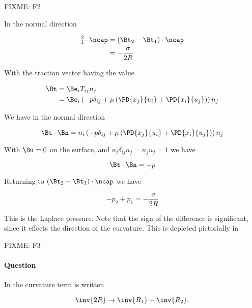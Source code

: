 FIXME: F2

In the normal direction

\begin{align*}
[\Bt]_1^2 \cdot \ncap
&= (\Bt_2 - \Bt_1) \cdot \ncap \\
&= -\frac{\sigma}{2 R} 
\end{align*}

With the traction vector having the value

\begin{align*}
\Bt 
&= \Be_i T_{ij} n_j \\
&= 
\Be_i \left( 
-p \delta_{ij} + \mu \left( 
\PD{x_j}{u_i}
+\PD{x_i}{u_j}
\right)
\right)
n_j
\end{align*}

We have in the normal direction

\begin{equation}\label{eqn:inclinedFlowWithoutConstantHeightAssumption:10}
\Bt \cdot \Bn 
=
n_i \left( 
-p \delta_{ij} + \mu \left( 
\PD{x_j}{u_i}
+\PD{x_i}{u_j}
\right)
\right) n_j
\end{equation}

With $\Bu = 0$ on the surface, and $n_i \delta_{ij} n_j = n_j n_j = 1$ we have

\begin{equation}\label{eqn:inclinedFlowWithoutConstantHeightAssumption:30}
\Bt \cdot \Bn = -p
\end{equation}

Returning to $(\Bt_2 - \Bt_1) \cdot \ncap$ we have

\begin{equation}\label{eqn:inclinedFlowWithoutConstantHeightAssumption:50}
\boxed{
-p_2 + p_1 = -\frac{\sigma}{2 R} 
}
\end{equation}

This is the Laplace pressure.  Note that the sign of the difference is significant, since it effects the direction of the curvature.  This is depicted pictorially in 

FIXME: F3

\paragraph{Question} In \cite{landau1987course} the curvature term is written

\begin{equation}\label{eqn:inclinedFlowWithoutConstantHeightAssumption:70}
\inv{2 R} \rightarrow \inv{R_1} + \inv{R_2}.
\end{equation}

